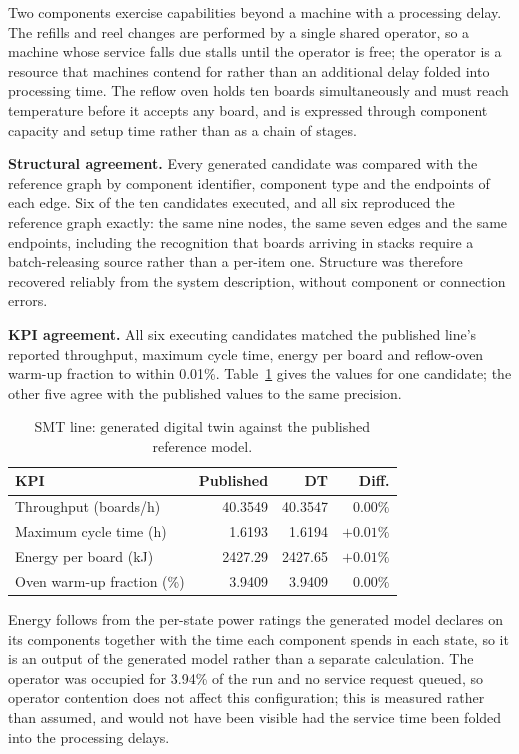 Two components exercise capabilities beyond a machine with a processing delay. The refills
and reel changes are performed by a single shared operator, so a machine whose service
falls due stalls until the operator is free; the operator is a resource that machines
contend for rather than an additional delay folded into processing time. The reflow oven
holds ten boards simultaneously and must reach temperature before it accepts any board,
and is expressed through component capacity and setup time rather than as a chain of
stages.

\noindent\textbf{Structural agreement.} Every generated candidate was compared with the
reference graph by component identifier, component type and the endpoints of each edge.
Six of the ten candidates executed, and all six reproduced the reference graph exactly:
the same nine nodes, the same seven edges and the same endpoints, including the
recognition that boards arriving in stacks require a batch-releasing source rather than a
per-item one. Structure was therefore recovered reliably from the system description,
without component or connection errors.

\noindent\textbf{KPI agreement.} All six executing candidates matched the published line's
reported throughput, maximum cycle time, energy per board and reflow-oven warm-up fraction
to within 0.01\%. Table~\ref{tab:smt_baseline} gives the values for one candidate; the
other five agree with the published values to the same precision.

\begin{table}[!t]
\centering
\caption{SMT line: generated digital twin against the published reference model.}
\label{tab:smt_baseline}
\footnotesize
\setlength{\tabcolsep}{4pt}
\begin{tabular}{@{}lrrr@{}}
\toprule
KPI & Published & DT & Diff. \\
\midrule
Throughput (boards/h)      & 40.3549 & 40.3547 & $0.00\%$ \\
Maximum cycle time (h)     & 1.6193  & 1.6194  & $+0.01\%$ \\
Energy per board (kJ)      & 2427.29 & 2427.65 & $+0.01\%$ \\
Oven warm-up fraction (\%) & 3.9409  & 3.9409  & $0.00\%$ \\
\bottomrule
\end{tabular}
\end{table}

Energy follows from the per-state power ratings the
generated model declares on its components together with the time each component spends in
each state, so it is an output of the generated model rather than a separate calculation.
The operator was occupied for 3.94\% of the run and no service request queued, so operator
contention does not affect this configuration; this is measured rather than assumed, and
would not have been visible had the service time been folded into the processing delays.


